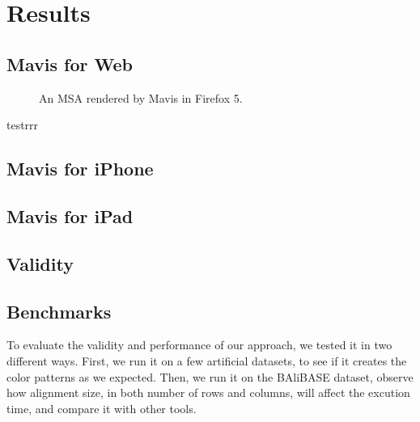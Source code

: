 \chapter{Results}\label{chap:Results}

\section{Mavis for Web}

\begin{figure}[p]
\caption[MSA Rendered by Mavis in Web Browser]{An MSA rendered by Mavis in Firefox 5.}\label{fig:chap5_mavis}
\end{figure}

testrrr

\section{Mavis for iPhone}

\section{Mavis for iPad}

\section{Validity}

\section{Benchmarks}

To evaluate the validity and performance of our approach, we tested it in two different ways. First, we run it on a few artificial datasets, to see if it creates the color patterns as we expected. Then, we run it on the BAliBASE dataset, observe how alignment size, in both number of rows and columns, will affect the excution time, and compare it with other tools.

